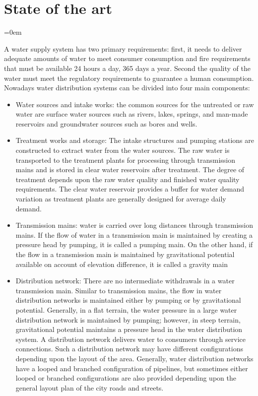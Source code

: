 \chapter{State of the art}
\label{capitolo2}
\thispagestyle{empty}
\parindent=0em



A water supply system has two primary requirements: first, it needs to deliver adequate amounts 
of water to meet consumer consumption and fire requirements that must be available 24 hours a 
day, 365 days a year. Second the quality of the water must meet the regulatory requirements to 
guarantee a human consumption. Nowadays water distribution systems can be divided into four main components: 
\begin{itemize}
    \item   Water sources and intake works: the common sources for the untreated or raw water are
     surface water sources such as rivers, lakes, springs, and man-made reservoirs and groundwater
      sources such as bores and wells.
    \item   Treatment works and storage: The intake structures and pumping stations are constructed 
    to extract water from the water sources. The raw water is transported to the treatment plants
     for processing through transmission mains and is stored in clear water reservoirs after 
     treatment. The degree of treatment depends upon the raw water quality and finished water 
     quality requirements. The clear water reservoir provides a buffer for water demand variation
      as treatment plants are generally designed for average daily demand.
    \item   Transmission mains: water is carried over long distances through transmission mains.
     If the flow of water in a transmission main is maintained by creating a pressure head by 
     pumping, it is called a pumping main. On the other hand, if the flow in a transmission main 
     is maintained by gravitational potential available on account of elevation difference, it is 
     called a gravity main
    \item   Distribution network: There are no intermediate withdrawals in a water transmission 
    main. Similar to transmission mains, the flow in water distribution networks is maintained 
    either by pumping or by gravitational potential. Generally, in a flat terrain, the water 
    pressure in a large water distribution network is maintained by pumping; however, in steep 
    terrain, gravitational potential maintains a pressure head in the water distribution system. 
    A distribution network delivers water to consumers through service connections. Such a 
    distribution network may have different configurations depending upon the layout of the area.
    Generally, water distribution networks have a looped and branched configuration of pipelines,
    but sometimes either looped or branched configurations are also provided depending upon the 
    general layout plan of the city roads and streets.
\end{itemize}

